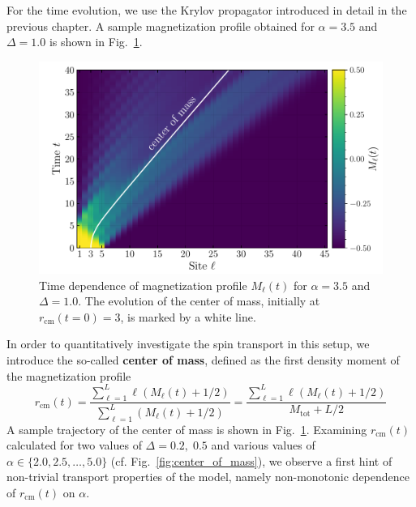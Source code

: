 For the time evolution, we use the Krylov propagator introduced in detail in the previous chapter.
A sample magnetization profile obtained for \(\alpha = 3.5\) and \(\Delta = 1.0\) is shown in 
Fig.~\ref{fig:magnetization_profile}.
\begin{figure}[htbp]
  \centering
  \includegraphics[width=0.9\linewidth]{Figures/magnetization.pdf}
  \caption{Time dependence of magnetization profile \(M_{\ell}(t)\) for \(\alpha = 3.5\) and \(\Delta = 1.0\).
  The evolution of the center of mass, initially at \(r_{\text{cm}}(t=0)=3\), is marked by a white line.}
  \label{fig:magnetization_profile}
\end{figure}
In order to quantitatively investigate the spin transport in this setup, we introduce the so-called
\textbf{center of mass}, defined as the first density moment of the magnetization profile  
\begin{equation}
  r_{\text{cm}}(t) = \frac{\sum_{\ell=1}^{L} \ell \left(M_{\ell}(t)+1/2\right)}
  {\sum_{\ell=1}^{L} \left(M_{\ell}(t) + 1/2\right)} = 
\frac{\sum_{\ell=1}^{L} \ell \left(M_{\ell}(t)+1/2\right)}
  {M_{\mathrm{tot}} + L/2}
  \label{eq:center_of_mass} 
\end{equation}
A sample trajectory of the center of mass is shown in Fig.~\ref{fig:magnetization_profile}. Examining \(r_{\text{cm}}(t)\)
calculated for two values of \(\Delta = 0.2,\;0.5\) and various values of \(\alpha \in \{2.0,2.5,\ldots,5.0\}\)
(cf. Fig.~\ref{fig:center_of_mass}), we observe a first hint of non-trivial transport properties of the model, namely
non-monotonic dependence of \(r_{\text{cm}}(t)\) on \(\alpha\). 

